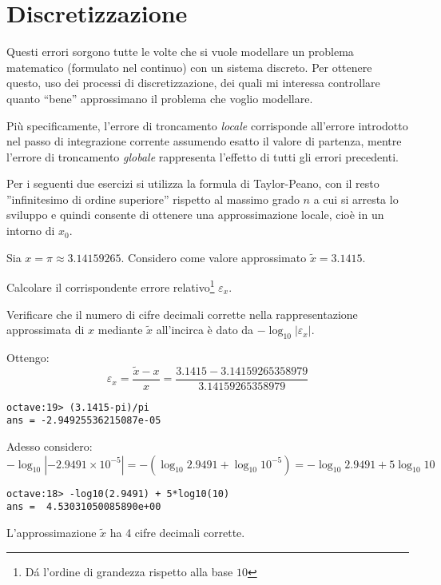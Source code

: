 \section{Discretizzazione} 

Questi errori sorgono tutte le volte che si vuole modellare un problema 
matematico (formulato nel continuo) con un sistema discreto. Per ottenere 
questo, uso dei processi di discretizzazione, dei quali mi interessa controllare
quanto ``bene'' approssimano il problema che voglio modellare.

Pi\`u specificamente, l'errore di troncamento \emph{locale} corrisponde 
all'errore introdotto nel passo di integrazione corrente assumendo esatto il 
valore di partenza, mentre l'errore di troncamento \emph{globale} rappresenta 
l'effetto di tutti gli errori precedenti.

Per i seguenti due esercizi si utilizza la formula di Taylor-Peano, con il 
resto ''infinitesimo di ordine superiore'' rispetto al massimo grado $n$ a cui 
si arresta lo sviluppo e quindi consente di ottenere una approssimazione
locale, cio\`e in un intorno di $x_{0}$.

\begin{exercise}[1.1]
	Sia $x = \pi \approx 3.14159265$. Considero come valore approssimato 
	$\tilde{x} = 3.1415$. 
	
	Calcolare il corrispondente errore relativo\footnote{D\'a l'ordine di 
	grandezza rispetto alla base $10$} $\varepsilon_{x}$. 
	
	Verificare che il numero di cifre decimali corrette nella rappresentazione 
	approssimata di $x$ mediante $\tilde{x}$ all'incirca \`e dato da $-\log_{10}
	{|\varepsilon_{x}|}$.
\end{exercise}
Ottengo:
\begin{displaymath}
	\varepsilon_{x} = \frac{\tilde{x}-x}{x} = \frac{3.1415-3.14159265358979}
	{3.14159265358979}
\end{displaymath}
\begin{lstlisting}
octave:19> (3.1415-pi)/pi
ans = -2.94925536215087e-05
\end{lstlisting}
Adesso considero:
\begin{equation*}
	-\log_{10}{|-2.9491 \times 10^{-5}|} = -\left (\log_{10}{2.9491} +
	\log_{10}{10^{-5}} \right ) = -\log_{10}{2.9491} + 5\log_{10}{10}
\end{equation*}
\begin{lstlisting}
octave:18> -log10(2.9491) + 5*log10(10)
ans =  4.53031050085890e+00
\end{lstlisting}
L'approssimazione $\tilde{x}$ ha 4 cifre decimali corrette.

